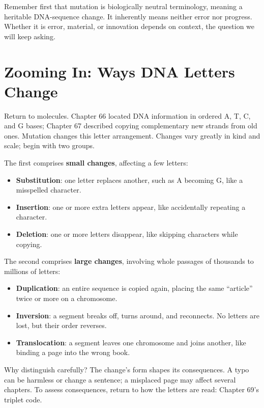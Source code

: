 Remember first that mutation is biologically neutral terminology, meaning a heritable DNA-sequence change. It inherently means neither error nor progress. Whether it is error, material, or innovation depends on context, the question we will keep asking.

\section{Zooming In: Ways DNA Letters Change}

Return to molecules. Chapter 66 located DNA information in ordered A, T, C, and G bases; Chapter 67 described copying complementary new strands from old ones. Mutation changes this letter arrangement. Changes vary greatly in kind and scale; begin with two groups.

The first comprises \textbf{small changes}, affecting a few letters:

\begin{itemize}[itemsep=2pt]
\item \textbf{Substitution}: one letter replaces another, such as A becoming G, like a misspelled character.
\item \textbf{Insertion}: one or more extra letters appear, like accidentally repeating a character.
\item \textbf{Deletion}: one or more letters disappear, like skipping characters while copying.
\end{itemize}

The second comprises \textbf{large changes}, involving whole passages of thousands to millions of letters:

\begin{itemize}[itemsep=2pt]
\item \textbf{Duplication}: an entire sequence is copied again, placing the same ``article'' twice or more on a chromosome.
\item \textbf{Inversion}: a segment breaks off, turns around, and reconnects. No letters are lost, but their order reverses.
\item \textbf{Translocation}: a segment leaves one chromosome and joins another, like binding a page into the wrong book.
\end{itemize}

Why distinguish carefully? The change's form shapes its consequences. A typo can be harmless or change a sentence; a misplaced page may affect several chapters. To assess consequences, return to how the letters are read: Chapter 69's triplet code.

